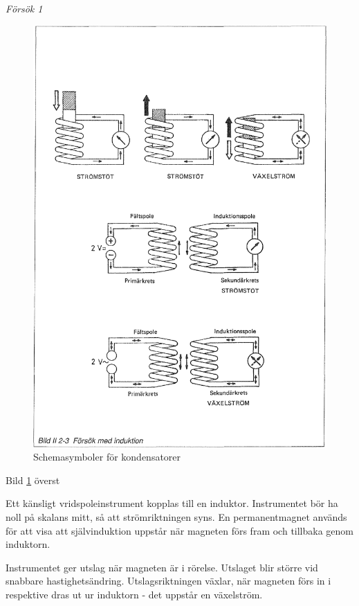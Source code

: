 \emph{Försök 1}

\begin{figure}
\begin{center}
\includegraphics[width=14cm]{images/bild_2_2-03}
\caption{Schemasymboler för kondensatorer}
\label{fig:BildII2-3}
\end{center}
\end{figure}

Bild \ref{fig:BildII2-3} överst

Ett känsligt vridspoleinstrument kopplas till en induktor. Instrumentet bör ha
noll på skalans mitt, så att strömriktningen syns. En permanentmagnet används
för att visa att självinduktion uppstår när magneten förs fram och tillbaka
genom induktorn.

Instrumentet ger utslag när magneten är i rörelse. Utslaget blir större vid
snabbare hastighetsändring. Utslagsriktningen växlar, när magneten förs in i
respektive dras ut ur induktorn - det uppstår en växelström.

